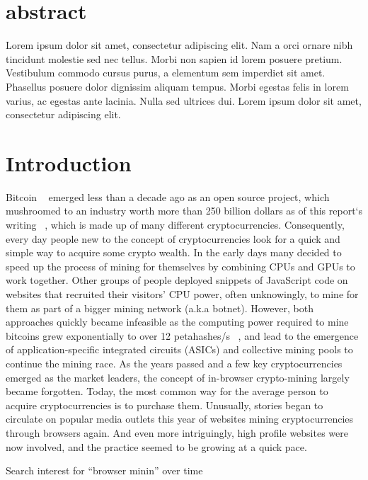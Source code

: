 \section{abstract}
Lorem ipsum dolor sit amet, consectetur adipiscing elit. Nam a orci ornare nibh tincidunt molestie sed nec tellus. Morbi non sapien id lorem posuere pretium. Vestibulum commodo cursus purus, a elementum sem imperdiet sit amet. Phasellus posuere dolor dignissim aliquam tempus. Morbi egestas felis in lorem varius, ac egestas ante lacinia. Nulla sed ultrices dui. Lorem ipsum dolor sit amet, consectetur adipiscing elit. 

\section{Introduction}

Bitcoin ~\cite{nakamoto2008bitcoin} emerged less than a decade ago as an open source project, which mushroomed to an industry worth more than 250 billion dollars as of this report`s writing ~\cite{coinmarketcap}, which is made up of many different cryptocurrencies. Consequently, every day people new to the concept of cryptocurrencies look for a quick and simple way to acquire some crypto wealth. In the early days many decided to speed up the process of mining for themselves by combining CPUs and GPUs to work together. Other groups of people deployed snippets of JavaScript code on websites that recruited their visitors’ CPU power, often unknowingly, to mine for them as part of a bigger mining network (a.k.a botnet). However, both approaches quickly became infeasible as the computing power required to mine bitcoins grew exponentially to over 12 petahashes/s ~\cite{blockchaininfohashrate}, and lead to the emergence of application-specific integrated circuits (ASICs) and collective mining pools to continue the mining race. As the years passed and a few key cryptocurrencies emerged as the market leaders, the concept of in-browser crypto-mining largely became forgotten. Today, the most common way for the average person to acquire cryptocurrencies is to purchase them. Unusually, stories began to circulate on popular media outlets this year of websites mining cryptocurrencies through browsers again. And even more intriguingly, high profile websites were now involved, and the practice seemed to be growing at a quick pace.

\begin{center}
	\caption{Search interest for ``browser minin'' over time}
\end{center}

